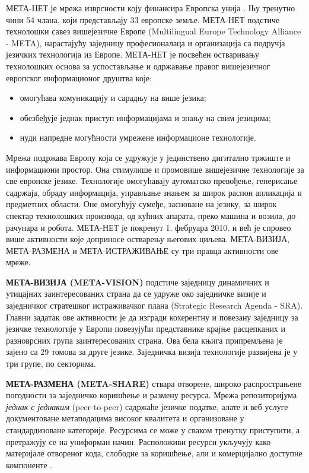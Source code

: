  \begin{multicols}{2}


МЕТА-НЕТ је мрежа изврсности коју финансира Европска унија \cite{rehm2011}. Њу тренутно чини 54 члана, који представљају 33 европске земље. МЕТА-НЕТ подстиче технолошки савез вишејезичне Европе (Multilingual Europe Technology Alliance - META), нарастајућу заједницу професионалаца и организација са подручја језичких технологија из Европе. 
МЕТА-НЕТ је посвећен остваривању технолошких основа за успостављање и одржавање правог вишејезичног европског информационог друштва које:
\begin{itemize}
\item омогућава комуникацију и сарадњу на више језика; 
\item обезбеђује једнак приступ информацијама и знању на свим језицима;
\item нуди напредне могућности умрежене информационе технологије.
\end{itemize}
Мрежа подржава Европу која се удружује у јединствено дигитално тржиште и информациони простор. Она стимулише и промовише вишејезичне технологије за све европске језике. Технологије омогућавају аутоматско превођење, генерисање садржаја, обраду информација, у\-прав\-ља\-ње знањем за широк распон апликација и предметних области. Оне омогућују сумеђе, засноване на језику, за широк спектар технолошких производа, од кућних апарата, преко машина и возила, до рачунара и робота. 
МЕТА-НЕТ је покренут 1. фебруара 2010. и већ је спровео више активности које доприносе остварењу његових циљева. МЕТА-ВИЗИЈА, МЕТА-РАЗМЕНА и МЕТА-ИСТРАЖИВАЊЕ су три правца активности ове мреже. 

\textbf{МЕТА-ВИЗИЈА (META-VISION)} подстиче заједницу динамичних и утицајних заинтересованих страна да се удруже око заједничке визије и заједничког стратешког истраживачког плана (Strategic Research Agenda - SRA). Главни задатак ове активности је да изгради кохерентну и повезану заједницу за језичке технологије у Европи повезујући представнике крајње расцепканих и разноврсних група заинтересованих страна. Ова бела књига припремљена је зајено са 29 томова за друге језике. Заједничка визија технологије развијена је у три групе, по секторима. 
   
\textbf{МЕТА-РАЗМЕНА (META-SHARE)} ствара отворене, широко распрострањене погодности за заједничко коришћење и размену ресурса. Мрежа репозиторијума \textit{једнак с једнаким} (peer-to-peer) садржаће језичке податке, алате и веб услуге документоване метаподацима високог квалитета и организоване у стандардизоване категорије. Ресурсима се може у сваком тренутку приступити, а претражују се на униформан начин. Расположиви ресурси укључују како материјале отвореног кода, слободне за коришћење, али и комерцијално доступне компоненте . 
   

\end{multicols}

